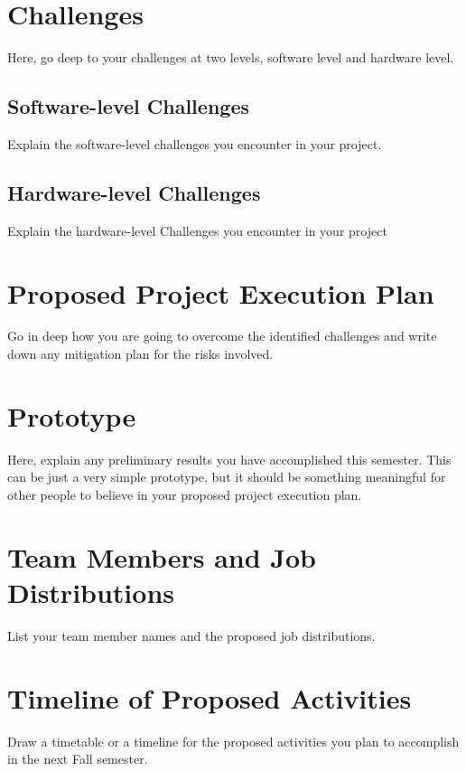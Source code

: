 \documentclass[conference, final]{IEEEtran}
\begin{document}
\section{Challenges}

Here, go deep to your challenges at two levels, software level and hardware level.


\subsection{Software-level Challenges}

Explain the software-level challenges you encounter in your project.

\subsection{Hardware-level Challenges}

Explain the hardware-level Challenges you encounter in your project

\section{Proposed Project Execution Plan}

Go in deep how you are going to overcome the identified challenges and
write down any mitigation plan for the risks involved.

\section{Prototype}

Here, explain any preliminary results you have accomplished this semester.
This can be just a very simple prototype, but it should be something
meaningful for other people to believe in your proposed project execution plan.

\section{Team Members and Job Distributions}

List your team member names and the proposed job distributions.

\section{Timeline of Proposed Activities}

Draw a timetable or a timeline for the proposed activities 
you plan to accomplish in the next Fall semester.
\end{document}
